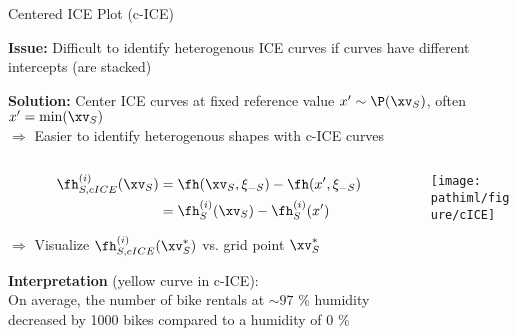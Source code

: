 \documentclass[11pt,compress,t,notes=noshow, aspectratio=169, xcolor=table]{beamer}
\newcommand{\pathiml}{../../slides/03_feature-effects/}
\begin{document}
\begin{frame}{Centered ICE Plot (c-ICE)}

\textbf{Issue:} Difficult to identify heterogenous ICE curves if curves have different intercepts (are stacked)

\textbf{Solution:} Center ICE curves at fixed reference value $x' \sim \P(\xv_S)$, often $x' = \min(\xv_S)$\\
$\Rightarrow$ Easier to identify heterogenous shapes with c-ICE curves
\vspace{-0.2cm}
\begin{columns}[c]
\begin{column}{0.4\textwidth}
$$\begin{aligned}
\fh_{S, cICE}^{(i)}(\xv_S)
&= \fh(\xv_S, \xi_{-S}) - \fh(x', \xi_{-S}) \\
&= \fh_{S}^{(i)}(\xv_S) - \fh_{S}^{(i)}(x')
\end{aligned}$$

$\Rightarrow$ Visualize $\fh_{S, cICE}^{(i)}(\xv_S^*)$ vs. grid point $\xv_S^*$

\lz
\pause
\textbf{Interpretation} (yellow curve in c-ICE): \\
On average, the number of bike rentals at $\sim 97$ \% humidity decreased by 1000 bikes compared to a humidity of 0 \%
\end{column}
\begin{column}{0.59\textwidth}
\begin{center}
\texttt{[image: \\pathiml/figure/cICE]}
\end{center}
\end{column}
\end{columns}


\end{frame}
\end{document}
